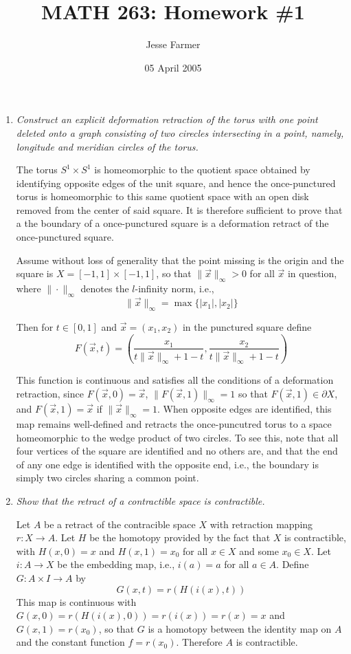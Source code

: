 \documentclass[10pt]{article}
\title{MATH 263: Homework \#1}
\author{Jesse Farmer}
\date{05 April 2005}
\begin{document}
\maketitle
\begin{enumerate}

\item \emph{Construct an explicit deformation retraction of the torus with one point deleted onto a graph consisting of two cirecles intersecting in a point, namely, longitude and meridian circles of the torus.}

The torus $S^1 \times S^1$ is homeomorphic to the quotient space obtained by identifying opposite edges of the unit square, and hence the once-punctured torus is homeomorphic to this same quotient space with an open disk removed from the center of said square.  It is therefore sufficient to prove that a the boundary of a once-punctured square is a deformation retract of the once-punctured square.

Assume without loss of generality that the point missing is the origin and the square is $X = [-1,1] \times [-1,1]$, so that $\|\vec{x}\|_\infty > 0$ for all $\vec{x}$ in question, where $\| \cdot \|_\infty$ denotes the $l$-infinity norm, i.e.,
\[
\|\vec{x}\|_\infty = \max\{|x_1|, |x_2|\}
\]

Then for $t \in [0,1]$ and $\vec{x} = (x_1, x_2)$ in the punctured square define
\[
F(\vec{x}, t) = \left(\frac{x_1}{t\|\vec{x}\|_\infty + 1-t}, \frac{x_2}{t\|\vec{x}\|_\infty + 1-t}\right)
\]

This function is continuous and satisfies all the conditions of a deformation retraction, since $F(\vec{x},0) = \vec{x}$, $\|F(\vec{x}, 1)\|_\infty = 1$ so that $F(\vec{x}, 1) \in \partial X$, and $F(\vec{x}, 1) = \vec{x}$ if $\|\vec{x}\|_\infty = 1$.  When opposite edges are identified, this map remains well-defined and retracts the once-puncutred torus to a space homeomorphic to the wedge product of two circles.  To see this, note that all four vertices of the square are identified and no others are, and that the end of any one edge is identified with the opposite end, i.e., the boundary is simply two circles sharing a common point.

\item \emph{Show that the retract of a contractible space is contractible.}

Let $A$ be a retract of the contracible space $X$ with retraction mapping $r: X \rightarrow A$.  Let $H$ be the homotopy provided by the fact that $X$ is contractible, with $H(x,0) = x$ and $H(x,1) = x_0$ for all $x \in X$ and some $x_0 \in X$.  Let $i: A \rightarrow X$ be the embedding map, i.e., $i(a) = a$ for all $a \in A$.  Define $G: A \times I \rightarrow A$ by $$G(x,t) = r(H(i(x),t))$$  This map is continuous with $G(x,0) = r(H(i(x),0)) = r(i(x)) = r(x) = x$ and $G(x,1) = r(x_0)$, so that $G$ is a homotopy between the identity map on $A$ and the constant function $f = r(x_0)$.  Therefore $A$ is contractible.


\end{enumerate}
\end{document}
